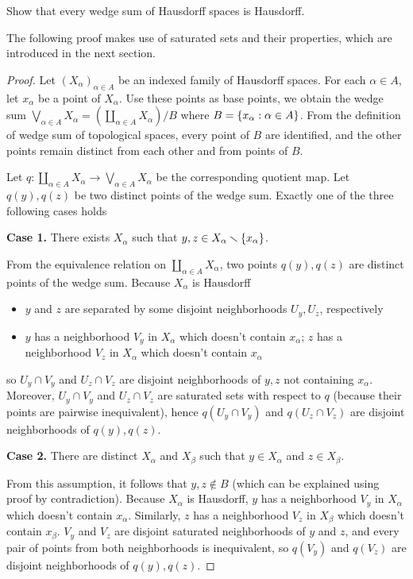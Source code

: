 \begin{exercise}{3.55}
	Show that every wedge sum of Hausdorff spaces is Hausdorff.
\end{exercise}

The following proof makes use of saturated sets and their properties, which are introduced in the next section.

\begin{proof}
	Let ${(X_{\alpha})}_{\alpha\in A}$ be an indexed family of Hausdorff spaces. For each $\alpha\in A$, let $x_{\alpha}$ be a point of $X_{\alpha}$. Use these points as base points, we obtain the wedge sum $\bigvee_{\alpha\in A}X_{\alpha} = \left(\coprod_{\alpha\in A}X_{\alpha}\right)/B$ where $B = \left\{{ x_{\alpha} : \alpha\in A }\right\}$. From the definition of wedge sum of topological spaces, every point of $B$ are identified, and the other points remain distinct from each other and from points of $B$.

	Let $q: \coprod_{\alpha\in A}X_{\alpha}\to \bigvee_{\alpha\in A}X_{\alpha}$ be the corresponding quotient map. Let $q(y), q(z)$ be two distinct points of the wedge sum. Exactly one of the three following cases holds

	\textbf{Case 1.} There exists $X_{\alpha}$ such that $y, z \in X_{\alpha}\smallsetminus\left\{{x_{\alpha}}\right\}$.

	From the equivalence relation on $\coprod_{\alpha\in A}X_{\alpha}$, two points $q(y), q(z)$ are distinct points of the wedge sum. Because $X_{\alpha}$ is Hausdorff
	\begin{itemize}
		\item $y$ and $z$ are separated by some disjoint neighborhoods $U_{y}, U_{z}$, respectively
		\item $y$ has a neighborhood $V_{y}$ in $X_{\alpha}$ which doesn't contain $x_{\alpha}$; $z$ has a neighborhood $V_{z}$ in $X_{\alpha}$ which doesn't contain $x_{\alpha}$
	\end{itemize}

	so $U_{y}\cap V_{y}$ and $U_{z}\cap V_{z}$ are disjoint neighborhoods of $y, z$ not containing $x_{\alpha}$. Moreover, $U_{y}\cap V_{y}$ and $U_{z}\cap V_{z}$ are saturated sets with respect to $q$ (because their points are pairwise inequivalent), hence $q(U_{y}\cap V_{y})$ and $q(U_{z}\cap V_{z})$ are disjoint neighborhoods of $q(y), q(z)$.

	\textbf{Case 2.} There are distinct $X_{\alpha}$ and $X_{\beta}$ such that $y\in X_{\alpha}$ and $z\in X_{\beta}$.

	From this assumption, it follows that $y, z\notin B$ (which can be explained using proof by contradiction). Because $X_{\alpha}$ is Hausdorff, $y$ has a neighborhood $V_{y}$ in $X_{\alpha}$ which doesn't contain $x_{\alpha}$. Similarly, $z$ has a neighborhood $V_{z}$ in $X_{\beta}$ which doesn't contain $x_{\beta}$. $V_{y}$ and $V_{z}$ are disjoint saturated neighborhoods of $y$ and $z$, and every pair of points from both neighborhoods is inequivalent, so $q(V_{y})$ and $q(V_{z})$ are disjoint neighborhoods of $q(y), q(z)$.


\end{proof}
